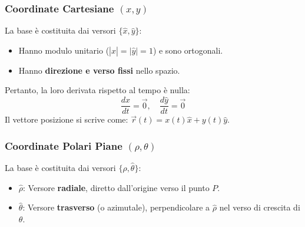 \subsubsection{Coordinate Cartesiane \texorpdfstring{$(x, y)$}{(x, y)}}
La base è costituita dai versori $\{\hat{x}, \hat{y}\}$:
\begin{itemize}
    \item Hanno modulo unitario ($|\hat{x}| = |\hat{y}| = 1$) e sono ortogonali.
    \item Hanno \textbf{direzione e verso fissi} nello spazio.
\end{itemize}
Pertanto, la loro derivata rispetto al tempo è nulla:
\begin{equation}
    \frac{d\hat{x}}{dt} = \vec{0}, \quad \frac{d\hat{y}}{dt} = \vec{0}
\end{equation}
Il vettore posizione si scrive come: $\vec{r}(t) = x(t)\hat{x} + y(t)\hat{y}$.

\begin{center}
\end{center}

\subsubsection{Coordinate Polari Piane \texorpdfstring{$(\rho, \theta)$}{(rho, theta)}}
La base è costituita dai versori $\{\hat{\rho}, \hat{\theta}\}$:
\begin{itemize}
    \item $\hat{\rho}$: Versore \textbf{radiale}, diretto dall'origine verso il punto $P$.
    \item $\hat{\theta}$: Versore \textbf{trasverso} (o azimutale), perpendicolare a $\hat{\rho}$ nel verso di crescita di $\theta$.
\end{itemize}

